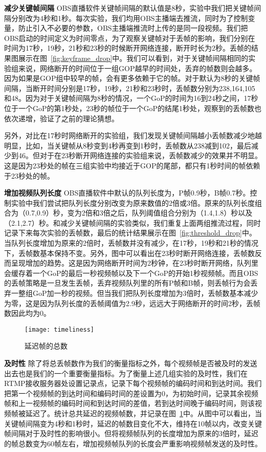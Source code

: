 \textbf{减少关键帧间隔} OBS直播软件关键帧间隔的默认值是8秒，实验中我们把关键帧间隔分别改为4秒和1秒。每次实验，我们均用OBS主播端去推流，同时为了控制变量，防止引入不必要的参数，OBS主播端推流时上传的是同一段视频。我们把OBS启动的时间定义为时间零点，为了观察关键帧对于丢帧的影响，我们分别在时间为17秒，19秒，21秒和23秒的时候断开网络连接，断开时长为2秒。丢帧的结果图展示在图~\ref{fig:keyframe_drop}中。我们可以看到，对于关键帧间隔相同的实验组来说，网络断开的时间位于一组GOP越早的时间处，丢弃的帧数则会越多。因为如果是GOP组中较早的帧，会有更多依赖于它的帧。对于默认为8秒的关键帧间隔，当断开时间分别是17秒，19秒，21秒和23秒时，丢帧数分别为238,164,105和48。因为对于关键帧间隔为8秒的情况，一个GoP的时间为16到24秒之间，17秒位于一个GoP的第1秒处，23秒的帧位于一个GoP的结尾1秒处，观察到的丢帧数也依次递增，验证了之前的理论猜想。

另外，对比在17秒时网络断开的实验组，我们发现关键帧间隔越小丢帧数减少地越明显，比如，当关键帧从8秒变到4秒再变到1秒时，丢帧数从238减到102，最后减少到46。但对于在23秒断开网络连接的实验组来说，丢帧数减少的效果并不明显。这是因为23秒处的帧在三组实验中均接近于GOP的尾部，都只有1秒时间的帧依赖于23秒处的帧。

\textbf{增加视频队列长度} OBS直播软件中默认的队列长度为，P帧0.9秒，B帧0.7秒。控制实验中我们尝试把队列长度分别改变为原来数值的2倍或3倍。原来的队列长度组合为（0.7,0.9）秒，变为2倍和3倍之后，队列阈值组合分别为（1.4,1.8）秒以及（2.1,2.7）秒。和减少关键帧间隔的实验类似，我们重复上面两组推流过程，同时记录下来每次实验的丢帧数，最后的统计结果展示在图~\ref{fig:threshold_drop}中。当队列长度增加为原来的2倍时，丢帧数并没有减少，在17秒，19秒和21秒的情况下，丢帧数基本保持不变。另外，图中可以看出在23秒时断开网络连接，丢帧数反而呈现增加的趋势。这是因为网络断开时间为2秒钟，在23秒时断开网络，队列里会缓存着一个GoP的最后一秒视频帧以及下一个GoP的开始1秒视频帧。而且OBS的丢帧策略是一旦发生丢帧，丢弃视频队列里的所有P帧和B帧，则丢帧行为会丢弃一整组GoP加一秒的视频。但当我们把队列长度增加为3倍时，丢帧数基本减少为零，这是因为队列长度的丢帧阈值为2.9秒，远远大于网络断开的时间2秒，丢帧数因此均为0。

\begin{figure}[h]%
  \centering
  \texttt{[image: timeliness]}
  \caption{延迟帧的总数}
  \label{fig:timeliness}
\end{figure}

\textbf{及时性} 除了将总丢帧数作为我们的衡量指标之外，每个视频帧是否被及时的发送出去也是我们的一个重要衡量指标。为了衡量上述几组实验的及时性，我们在RTMP接收服务器处设置记录点，记录下每个视频帧的编码时间和到达时间。我们把第一个视频帧的到达时间和编码时间的差设置为0，为初始时间，记录其余视频帧和上一视频帧的编码时间和到达时间的差值，若到达时间晚于编码时间，则该视频帧被延迟了。统计总共延迟的视频帧数，并记录在图~\ref{fig:timeliness}中。从图中可以看出，当关键帧间隔变为4秒和1秒时，延迟的帧数目变化不大，维持在10帧以内，改变关键帧间隔对于及时性的影响很小。但将视频帧队列的长度增加为原来的3倍时，延迟的帧总数变为60帧左右，增加视频帧队列的长度会严重影响视频帧发送的及时性。

